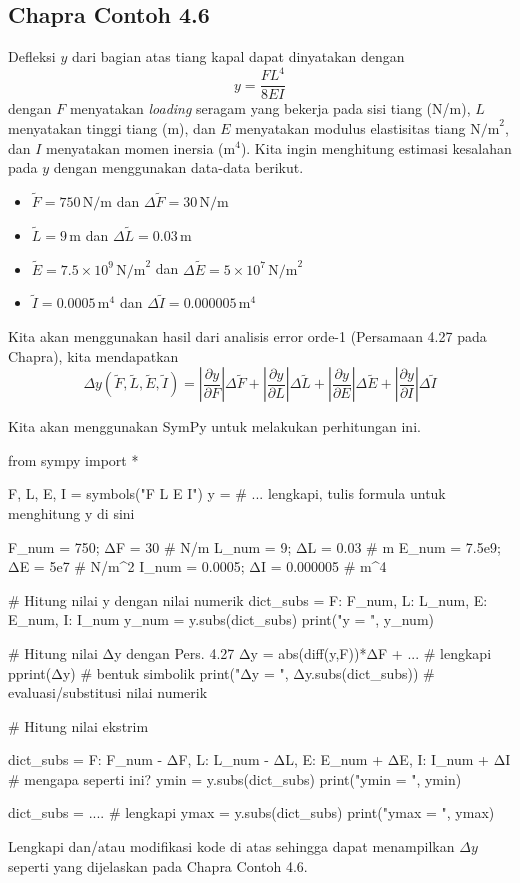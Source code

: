 \subsection{Chapra Contoh 4.6}

Defleksi $y$ dari bagian atas tiang kapal dapat dinyatakan
dengan
\begin{equation}
y = \frac{FL^{4}}{8EI}
\end{equation}
dengan $F$ menyatakan \textit{loading} seragam yang bekerja pada sisi
tiang (N/m), $L$ menyatakan tinggi tiang (m), dan $E$ menyatakan
modulus elastisitas tiang $\textrm{N/m}^{2}$, dan $I$ menyatakan
momen inersia ($\textrm{m}^{4}$). Kita ingin menghitung estimasi kesalahan
pada $y$ dengan menggunakan data-data berikut.
\begin{itemize}
\item $\tilde{F} = 750\,\textrm{N/m}$ dan $\Delta\tilde{F} = 30\,\textrm{N/m}$
\item $\tilde{L} = 9\,\textrm{m}$ dan $\Delta\tilde{L} = 0.03\,\textrm{m}$
\item $\tilde{E} = 7.5\times10^{9}\,\textrm{N/m}^{2}$ dan $\Delta\tilde{E} = 5\times10^{7}\,\textrm{N/m}^{2}$
\item $\tilde{I} = 0.0005\,\textrm{m}^{4}$ dan $\Delta\tilde{I} = 0.000005\,\textrm{m}^{4}$
\end{itemize}

Kita akan menggunakan hasil dari analisis error orde-1 (Persamaan 4.27 pada Chapra), kita
mendapatkan
\begin{equation*}
\Delta y(\tilde{F},\tilde{L},\tilde{E},\tilde{I}) =
\left| \frac{\partial y}{\partial F} \right| \Delta\tilde{F} +
\left| \frac{\partial y}{\partial L} \right| \Delta\tilde{L} +
\left| \frac{\partial y}{\partial E} \right| \Delta\tilde{E} +
\left| \frac{\partial y}{\partial I} \right| \Delta\tilde{I}
\end{equation*}

Kita akan menggunakan SymPy untuk melakukan perhitungan ini.

\begin{pythoncode}
from sympy import *

F, L, E, I = symbols("F L E I")
y = # ... lengkapi, tulis formula untuk menghitung y di sini
    
F_num = 750; ΔF = 30 # N/m
L_num = 9; ΔL = 0.03 # m
E_num = 7.5e9; ΔE = 5e7 # N/m^2
I_num = 0.0005; ΔI = 0.000005 # m^4

# Hitung nilai y dengan nilai numerik
dict_subs = {F: F_num, L: L_num, E: E_num, I: I_num}
y_num = y.subs(dict_subs)
print("y = ", y_num)

# Hitung nilai Δy dengan Pers. 4.27
Δy = abs(diff(y,F))*ΔF + ... # lengkapi
pprint(Δy) # bentuk simbolik
print("Δy = ", Δy.subs(dict_subs)) # evaluasi/substitusi nilai numerik

# Hitung nilai ekstrim

dict_subs = {
  F: F_num - ΔF, L: L_num - ΔL,
  E: E_num + ΔE, I: I_num + ΔI  # mengapa seperti ini?
} 
ymin = y.subs(dict_subs)
print("ymin = ", ymin)
    
dict_subs = .... # lengkapi 
ymax = y.subs(dict_subs)
print("ymax = ", ymax)    
\end{pythoncode}

\begin{soal}
Lengkapi dan/atau modifikasi kode di atas sehingga dapat menampilkan $\Delta y$
seperti yang dijelaskan pada Chapra Contoh 4.6.
\end{soal}